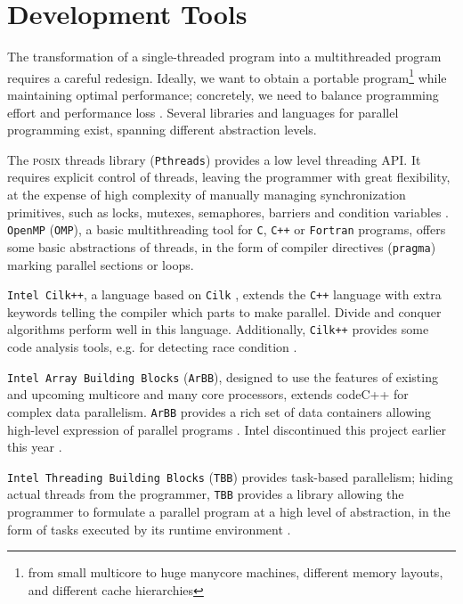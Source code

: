\documentclass[a4paper,11pt, oneside]{report}
\newcommand{\code}[1]{\texttt{#1}}
\newcommand{\acro}[1]{\textsc{#1}}
\begin{document}
\section{Development Tools}
The transformation of a single-threaded program into a multithreaded program requires a careful redesign. Ideally, we want to obtain a portable program\footnote{from small multicore to huge manycore machines, different memory layouts, and different cache hierarchies} while maintaining optimal performance; concretely, we need to balance programming effort and performance loss \cite{michailidis-margaritis}. Several libraries and languages for parallel programming exist, spanning different abstraction levels. 


The \acro{posix} threads library (\code{Pthreads}) provides a low level threading \acro{API}. It requires explicit control of threads, leaving the programmer with great flexibility, at the expense of high complexity of manually managing synchronization primitives, such as locks, mutexes, semaphores, barriers and condition variables \cite{michailidis-margaritis, snyder-lin}. \code{OpenMP} (\code{OMP}), a basic multithreading tool for \code{C}, \code{C++} or \code{Fortran} programs, offers some basic abstractions of threads, in the form of compiler directives (\code{pragma}) marking parallel sections or loops\cite{omp, michailidis-margaritis, snyder-lin}.

\code{Intel Cilk++}, a language based on \code{Cilk} \cite{cilk}, extends the \code{C++} language with extra keywords telling the compiler which parts to make parallel. Divide and conquer algorithms perform well in this language. Additionally, \code{Cilk++} provides some code analysis tools, e.g. for detecting race condition \cite{michailidis-margaritis}.

\code{Intel Array Building Blocks} (\code{ArBB}), designed to use the features of existing and upcoming multicore and many core processors, extends code{C++} for complex data parallelism. \code{ArBB} provides a rich set of data containers allowing high-level expression of parallel programs \cite{michailidis-margaritis}. Intel discontinued this project earlier this year \cite{intel-arbb}.

\code{Intel Threading Building Blocks} (\code{TBB}) provides task-based parallelism; hiding actual threads from the programmer, \code{TBB} provides a library allowing the programmer to formulate a parallel program at a high level of abstraction, in the form of tasks executed by its runtime environment \cite{tbb, michailidis-margaritis}.
\end{document}
